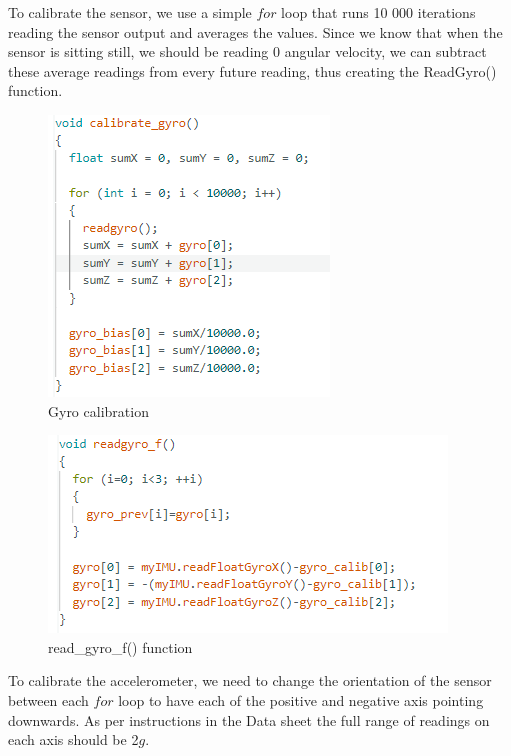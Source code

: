 \begin{flushleft}
\begin{flushleft}
To calibrate the sensor, we use a simple $for$ loop that runs 10 000 iterations reading the sensor output and averages the values. Since we know that when the sensor is sitting still, we should be reading 0 angular velocity, we can subtract these average readings from every future reading, thus creating the ReadGyro() function. 
\end{flushleft}

\begin{figure}[H]
    \begin{center}
    \includegraphics[scale = 0.85]{pictures/IMU/gyro_calibrate.png}
    \end{center}
    \caption{Gyro calibration}
    \label{fig:my_label}
\end{figure}

\begin{figure}[H]
    \begin{center}
    \includegraphics[scale = 0.85]{pictures/IMU/read_gyro_f.png}
    \end{center}
    \caption{read_gyro_f() function}
    \label{fig:my_label}
\end{figure}

\begin{flushleft}
To calibrate the accelerometer, we need to change the orientation of the sensor between each $for$ loop to have each of the positive and negative axis pointing downwards. As per instructions in the Data sheet the full range of readings on each axis should be 2$g$. 


\end{flushleft}
\end{flushleft}
